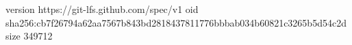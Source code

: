 version https://git-lfs.github.com/spec/v1
oid sha256:cb7f26794a62aa7567b843bd2818437811776bbbab034b60821c3265b5d54c2d
size 349712
